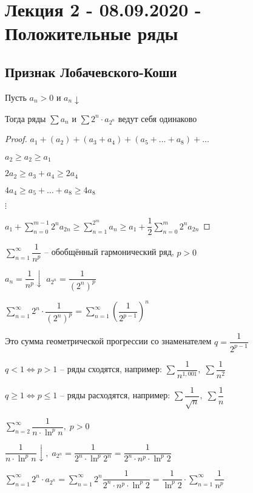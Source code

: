 \section{Лекция 2 - 08.09.2020 - Положительные ряды}
\subsection{Признак Лобачевского-Коши}
\begin{proposal}
    Пусть $a_n > 0$ и $a_n \downarrow$

    Тогда ряды $\sum a_n$ и $\sum 2^n \cdot a_{2^n}$ ведут себя одинаково
\end{proposal}
\begin{proof}
    $a_1 + (a_2) + (a_3 + a_4) + (a_5 + \dots + a_8) + \dots$

	$a_2 \geq a_2 \geq a_1$
	
	$2a_2 \geq a_3 + a_4 \geq 2a_4$
	
	$4a_4 \geq a_5 + \dots + a_8 \geq 4a_8$

    $\vdots$

    $a_1 + \sum_{n=0}^{m - 1} 2^n a_{2n} \geq \sum_{n = 1}^{2^m} a_n \geq a_1 + \dfrac{1}{2} \sum_{n=0}^{m} 2^n a_{2n}$

\end{proof}

\begin{example}
    $\sum_{n=1}^{\infty} \dfrac{1}{n^p}$ -- обобщённый гармонический ряд, $p>0$

    $a_n = \dfrac{1}{n^p} \downarrow$\qquad
    $a_{2^n} = \dfrac{1}{\left(2^n\right)^p}$

    $\sum_{n=1}^{\infty} 2^n \cdot \dfrac{1}{\left(2^n\right)^p} = \sum_{n=1}^{\infty} \left(\dfrac{1}{2^{p - 1}}\right)^n$

    Это сумма геометрической прогрессии со знаменателем $q = \dfrac{1}{2^{p - 1}}$

    $q < 1 \iff p > 1$ -- ряды сходятся, например: $\sum \dfrac{1}{n^{1,001}},\; \sum \dfrac{1}{n^2}$
    
    $q \geq 1 \iff p \leq 1$ -- ряды расходятся, например: $\sum \dfrac{1}{\sqrt{n}},\; \sum \dfrac{1}{n}$
   
\end{example}

\begin{example}
    $\sum_{n=2}^{\infty} \dfrac{1}{n \cdot \ln^p{n}},\; p > 0$

    $\dfrac{1}{n \cdot \ln^p{n}} \downarrow,\; a_{2^n} = \dfrac{1}{2^n \cdot \ln^p{2^n}} = \dfrac{1}{2^n \cdot n^p \cdot \ln^p{2}}$

    $\sum_{n=1}^{\infty} 2^n \cdot a_{2^n} = \sum_{n=1}^{\infty} 2^n \dfrac{1}{2^n \cdot n^p \cdot \ln^p{2}} = \dfrac{1}{\ln^p 2} \cdot \sum_{n=1}^{\infty} \dfrac{1}{n^p}$
\end{example}

